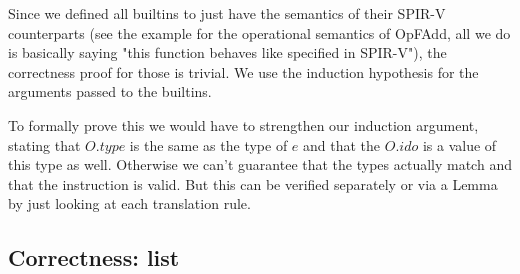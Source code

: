 \documentclass[letterpaper,12pt]{article}
\begin{document}
Since we defined all builtins to just have the semantics of their
SPIR-V counterparts (see the example for the operational semantics of OpFAdd,
all we do is basically saying "this function behaves like specified in
SPIR-V"), the correctness proof for those is trivial. We use the
induction hypothesis for the arguments passed to the builtins.

To formally prove this we would have to strengthen our induction
argument, stating that $O.type$ is the same as the type of $e$ and that
the $O.ido$ is a value of this type as well. Otherwise we can't guarantee 
that the types actually match and that the instruction is valid.
But this can be verified separately or via a Lemma by just looking at
each translation rule.

% 

\subsection{Correctness: list}

% 
\end{document}
